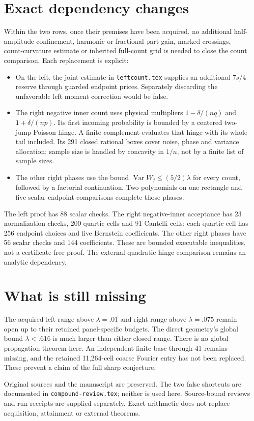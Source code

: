 \documentclass[11pt]{article}
\begin{document}
\section*{Exact dependency changes}
Within the two rows, once their premises have been acquired, no additional
half-amplitude confinement, harmonic or fractional-part gain, marked
crossings, count-curvature estimate or inherited full-count grid is needed to close the
count comparison. Each replacement is explicit:
\begin{itemize}
 \item On the left, the joint estimate in \texttt{leftcount.tex} supplies
 an additional $7s/4$ reserve through guarded endpoint prices.
 Separately discarding the unfavorable
 left moment correction would be false.
 \item The right negative inner count uses physical multipliers
 $1-\delta/(nq)$ and $1+\delta/(np)$. Its first incoming probability
 is bounded by a centered two-jump Poisson hinge. A finite complement
 evaluates that hinge with its whole tail included. Its 291 closed
 rational boxes cover noise, phase and variance allocation; sample size
 is handled by concavity in $1/n$, not by a finite list of sample sizes.
 \item The other right phases use the bound
 $\operatorname{Var}W_j\le(5/2)\lambda$ for every count, followed by
 a factorial continuation. Two polynomials on one rectangle and five
 scalar endpoint comparisons complete those phases.
\end{itemize}
The left proof has 88 scalar checks. The right negative-inner acceptance
has 23 normalization checks, 200 quartic cells and 91 Cantelli cells;
each quartic cell has 256 endpoint choices and five Bernstein coefficients.
The other right phases have 56 scalar checks and 144 coefficients.
These are bounded executable inequalities, not a certificate-free proof.
The external quadratic-hinge comparison remains an analytic dependency.

\section*{What is still missing}
The acquired left range above $\lambda=.01$ and right range above
$\lambda=.075$ remain open up to their retained panel-specific budgets.
The direct geometry's global bound $\lambda<.616$ is much larger than
either closed range. There is no global propagation theorem here.
An independent finite base through 41 remains missing, and the retained
11,264-cell coarse Fourier entry has not been replaced. These prevent a
claim of the full sharp conjecture.

Original sources and the manuscript are preserved. The two false shortcuts
are documented in \texttt{compound-review.tex}; neither is used here.
Source-bound reviews and run receipts are supplied separately. Exact
arithmetic does not replace acquisition, attainment or external theorems.
\end{document}
